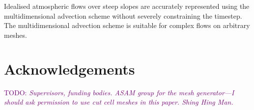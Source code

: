 \documentclass{article}
\newcommand{\TODO}[1]{\textcolor{purple}{TODO: \emph{#1}}}
\begin{document}
Idealised atmospheric flows over steep slopes are accurately represented using the multidimensional advection scheme without severely constraining the timestep.  The multidimensional advection scheme is suitable for complex flows on arbitrary meshes.

\section{Acknowledgements}
\TODO{Supervisors, funding bodies.  ASAM group for the mesh generator---I should ask permission to use cut cell meshes in this paper.  Shing Hing Man.}



\end{document}

